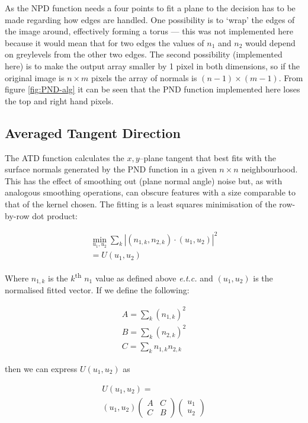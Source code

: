 \documentclass[11pt,a4paper]{article}
\begin{document}
\begin{multicols}{2}
		As the NPD function needs a four points to fit a plane to the decision has to be made regarding how edges are handled. One possibility is to `wrap' the edges of the image around, effectively forming a torus --- this was not implemented here because it would mean that for two edges the values of $n_1$ and $n_2$ would depend on greylevels from the other two edges. The second possibility (implemented here) is to make the output array smaller by 1 pixel in both dimensions, so if the original image is $n \times m$ pixels the array of normals is $(n-1) \times (m-1)$. From figure \ref{fig:PND-alg} it can be seen that the PND function implemented here loses the top and right hand pixels.

	\subsection{Averaged Tangent Direction}
		The ATD function calculates the $x,y$--plane tangent that best fits with the surface normals generated by the PND function in a given $n \times n$ neighbourhood. This has the effect of smoothing out (plane normal angle) noise but, as with analogous smoothing operations, can obscure features with a size comparable to that of the kernel chosen. The fitting is a least squares minimisation of the row-by-row dot product:

		\begin{equation}
		\begin{split}
			\min_{u_1, u_2} \sum_k |(n_{1,k}, n_{2,k}) \cdot (u_1, u_2)|^2 \\
			= U(u_1, u_2)
		\end{split}
		\end{equation}

		Where $n_{1,k}$ is the $k$\textsuperscript{th} $n_1$ value as defined above \textit{e.t.c.} and $(u_1, u_2)$ is the normalised fitted vector. If we define the following:

		\begin{equation}
		\begin{split}
			A = \sum_k (n_{1,k})^2 \\
			B = \sum_k (n_{2,k})^2 \\
			C = \sum_k n_{1,k} n_{2,k}
		\end{split}
		\end{equation}

		then we can express $U(u_1, u_2)$ as

		\begin{equation}\label{eq:U_mat}
		\begin{split}
			U(u_1, u_2) = \\ (u_1, u_2)
			\begin{pmatrix}
			A & C \\
			C & B
			\end{pmatrix}
			\begin{pmatrix}
			u_1\\
			u_2
			\end{pmatrix}
		\end{split}
		\end{equation}


\end{multicols}
\end{document}
